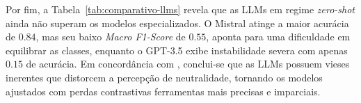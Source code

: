 Por fim, a Tabela~\ref{tab:comparativo-llms} revela que as LLMs em regime \textit{zero-shot} ainda não superam os modelos especializados. O Mistral atinge a maior acurácia de $0.84$, mas seu baixo 
\textit{Macro F1-Score} de $0.55$, aponta para uma dificuldade em equilibrar as classes, enquanto o GPT-3.5 exibe instabilidade severa com apenas $0.15$ de acurácia. 
Em concordância com \cite{lin-etal-2025-investigating}, conclui-se que as LLMs possuem vieses inerentes que distorcem a percepção de neutralidade, 
tornando os modelos ajustados com perdas contrastivas ferramentas mais precisas e imparciais.
